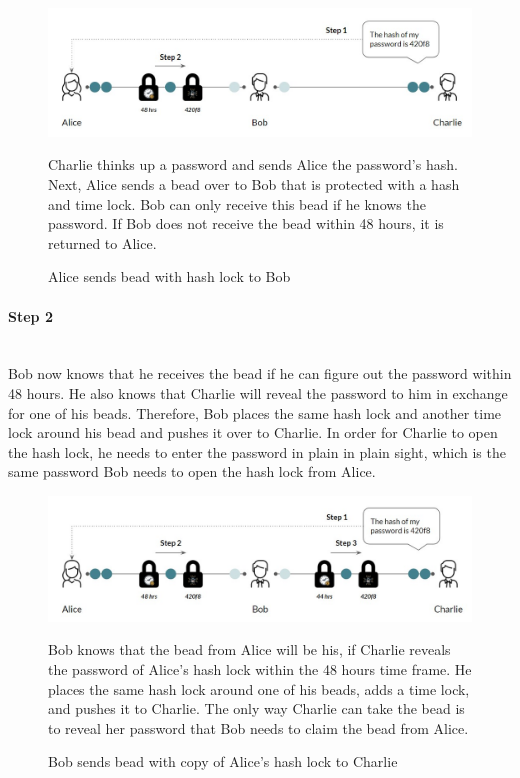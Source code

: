 \documentclass[a4paper, 12pt]{report}
\begin{document}
\begin{figure}[H]
	\includegraphics[width=\textwidth]{11_HTLC_Step1}
	\caption{Alice sends bead with hash lock to Bob}
	\medskip
	\small Charlie thinks up a password and sends Alice the password’s hash. Next, Alice sends a bead over to Bob that is protected with a hash and time lock. Bob can only receive this bead if he knows the password. If Bob does not receive the bead within 48 hours, it is returned to Alice.
	\label{fig:11_HTLC_Step1}
\end{figure}

\paragraph{Step 2} \hspace{0pt} \\
Bob now knows that he receives the bead if he can figure out the password within 48 hours. He also knows that Charlie will reveal the password to him in exchange for one of his beads. Therefore, Bob places the same hash lock and another time lock around his bead and pushes it over to Charlie. In order for Charlie to open the hash lock, he needs to enter the password in plain in plain sight, which is the same password Bob needs to open the hash lock from Alice.

\begin{figure}[H]
	\includegraphics[width=\textwidth]{12_HTLC_Step2}
	\caption{Bob sends bead with copy of Alice's hash lock to Charlie}
	\medskip
	\small Bob knows that the bead from Alice will be his, if Charlie reveals the password of Alice's hash lock within the 48 hours time frame. He places the same hash lock around one of his beads, adds a time lock, and pushes it to Charlie. The only way Charlie can take the bead is to reveal her password that Bob needs to claim the bead from Alice.
	\label{fig:12_HTLC_Step2}
\end{figure} 
\end{document}
